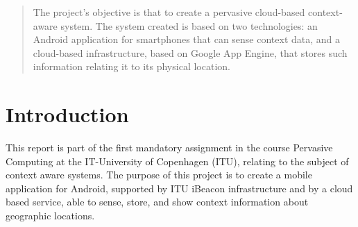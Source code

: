 \begin{abstract}
The project's objective is that to create a pervasive cloud-based context-aware system. 
The system created is based on two technologies: an Android application for smartphones that can sense context data, and a cloud-based infrastructure, based on Google App Engine, that stores such information relating it to its physical location.
\end{abstract}


\category{}{}{}

\section{Introduction}
This report is part of the first mandatory assignment in the course Pervasive Computing at the IT-University of Copenhagen (ITU), relating to the subject of context aware systems.
 The purpose of this project is to create a mobile application for Android, supported by ITU iBeacon infrastructure and by a  cloud based service, able to sense, store, and show context information about geographic locations. 